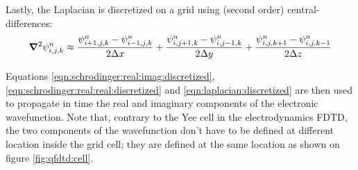 Lastly, the Laplacian is discretized on a grid using (second order)
central-differences:
\begin{align}
\bm{\nabla}^2 \psi_{i,j,k}^{n} \approx
      \frac{ \psi_{i+1,j,k}^{n} - \psi_{i-1,j,k}^{n} }{2 \Delta x}
    + \frac{ \psi_{i,j+1,k}^{n} - \psi_{i,j-1,k}^{n} }{2 \Delta y}
    + \frac{ \psi_{i,j,k+1}^{n} - \psi_{i,j,k-1}^{n} }{2 \Delta z}
\label{eqn:laplacian:discretized}
\end{align}

Equations \eqref{eqn:schrodinger:real:imag:discretized},
\eqref{eqn:schrodinger:real:real:discretized} and
\eqref{eqn:laplacian:discretized} are then used to propagate in time the real
and imaginary components of the electronic wavefunction. Note that, contrary
to the Yee cell in the electrodynamics FDTD, the two components of the
wavefunction don't have to be defined at different location inside the grid
cell; they are defined at the same location as shown on figure
\ref{fig:qfdtd:cell}.

